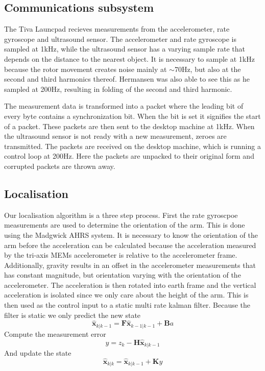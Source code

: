 \subsection{Communications subsystem}\label{sec:comms}
The Tiva Launcpad recieves measurements from the accelerometer, rate gyroscope and ultrasound sensor. The accelerometer and 
rate gyroscope is sampled at 1kHz, while the ultrasound sensor has a varying sample rate that depends on the distance to the nearest
object.
It is necessary to sample at 1kHz because the rotor movement creates noise mainly at \(\sim\)70Hz, but also at the second and 
third harmonics thereof. Hermansen was also able to see this as he sampled at 200Hz, resulting in folding of the second and third
harmonic.

The measurement data is transformed into a packet where the leading bit of every byte contains a synchronization bit. When
the bit is set it signifies the start of a packet. These packets are then sent to the desktop machine at 1kHz. When the ultrasound 
sensor is not ready with a new measurement, zeroes are transmitted. The packets are received on the desktop machine, which is 
running a control loop at 200Hz. Here the packets are unpacked to their original form and corrupted packets are thrown away.
\subsection{Localisation}\label{sec:localisation}
Our localisation algorithm is a three step process. First the rate gyroscpoe measurements are used to determine the orientation of
the arm. This is done using the Madgwick AHRS system\cite{Madgwick2011}. It is necessary to know the orientation of the arm before
the acceleration can be calculated because the acceleration measured by the tri-axis MEMs accelerometer is relative to the 
accelerometer frame. Additionally, gravity results in an offset in the accelerometer measurements that has constant magnitude, but
orientation varying with the orientation of the accelerometer. The acceleration is then rotated into earth frame and the vertical
acceleration is isolated since we only care about the height of the arm.
This is then used as the control input to a static multi rate kalman filter\cite{Welch2006}. Because the filter is static we
only predict the new state 
\begin{equation*}
	\hat{\mathbf{x}}_{k\vert k-1} = \mathbf{F}\hat{\mathbf{x}}_{k-1\vert k-1} + \mathbf{B}a
\end{equation*}
Compute the measurement error 
\begin{equation*}
	y = z_k - \mathbf{H}\hat{\mathbf{x}}_{k\vert k-1} 
\end{equation*}
And update the state
\begin{equation*}
	\hat{\mathbf{x}}_{k\vert k} = \hat{\mathbf{x}}_{k\vert k-1} + \mathbf{K} y
\end{equation*}

